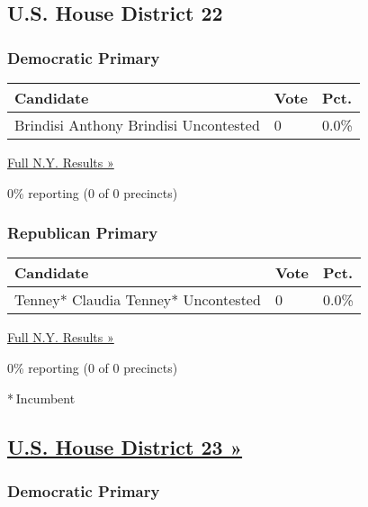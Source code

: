 \hypertarget{us-house-district-22}{%
\subsection{U.S. House District 22}\label{us-house-district-22}}

\hypertarget{democratic-primary-22}{%
\subsubsection{Democratic Primary}\label{democratic-primary-22}}

\begin{longtable}[]{@{}lll@{}}
\toprule
Candidate & Vote & Pct.\tabularnewline
\midrule
\endhead
 Brindisi Anthony Brindisi Uncontested & 0 & 0.0\%\tabularnewline
\bottomrule
\end{longtable}

\href{https://www.nytimes3xbfgragh.onion/elections/results/new-york}{Full
N.Y. Results »}

0\% reporting (0 of 0 precincts)

\hypertarget{republican-primary-16}{%
\subsubsection{Republican Primary}\label{republican-primary-16}}

\begin{longtable}[]{@{}lll@{}}
\toprule
Candidate & Vote & Pct.\tabularnewline
\midrule
\endhead
 Tenney* Claudia Tenney* Uncontested & 0 & 0.0\%\tabularnewline
\bottomrule
\end{longtable}

\href{https://www.nytimes3xbfgragh.onion/elections/results/new-york}{Full
N.Y. Results »}

0\% reporting (0 of 0 precincts)

* Incumbent

\hypertarget{us-house-district-23-}{%
\subsection{\texorpdfstring{\href{https://www.nytimes3xbfgragh.onion/elections/results/new-york-house-district-23-primary-election}{U.S.
House District 23
»}}{U.S. House District 23 »}}\label{us-house-district-23-}}

\hypertarget{democratic-primary-23}{%
\subsubsection{Democratic Primary}\label{democratic-primary-23}}

